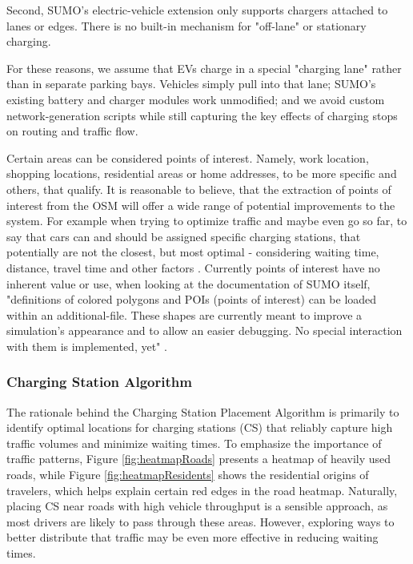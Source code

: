 Second, SUMO’s electric-vehicle extension only supports chargers attached to lanes or edges. There is no built-in mechanism for "off-lane" or stationary charging.

For these reasons, we assume that EVs charge in a special "charging lane" rather than in separate parking bays. Vehicles simply pull into that lane; SUMO’s existing battery and charger modules work unmodified; and we avoid custom network-generation scripts while still capturing the key effects of charging stops on routing and traffic flow.

Certain areas can be considered points of interest. Namely, work location, shopping locations, residential areas or home addresses, to be more specific and others, that qualify. It is reasonable to believe, that the extraction of points of interest from the OSM will offer a wide range of potential improvements to the system. For example when trying to optimize traffic and maybe even go so far, to say that cars can and should be assigned specific charging stations, that potentially are not the closest, but most optimal - considering waiting time, distance, travel time and other factors \cite{wevj14020040}. Currently points of interest have no inherent value or use, when looking at the documentation of SUMO itself, "definitions of colored polygons and POIs (points of interest) can be loaded within an additional-file. These shapes are currently meant to improve a simulation's appearance and to allow an easier debugging. No special interaction with them is implemented, yet" \cite{sumo_shapes}.

\subsubsection{Charging Station Algorithm}
The rationale behind the Charging Station Placement Algorithm is primarily to identify optimal locations for charging stations (CS) that reliably capture high traffic volumes and minimize waiting times. To emphasize the importance of traffic patterns, Figure \ref{fig:heatmapRoads} presents a heatmap of heavily used roads, while Figure \ref{fig:heatmapResidents} shows the residential origins of travelers, which helps explain certain red edges in the road heatmap. Naturally, placing CS near roads with high vehicle throughput is a sensible approach, as most drivers are likely to pass through these areas. However, exploring ways to better distribute that traffic may be even more effective in reducing waiting times.


